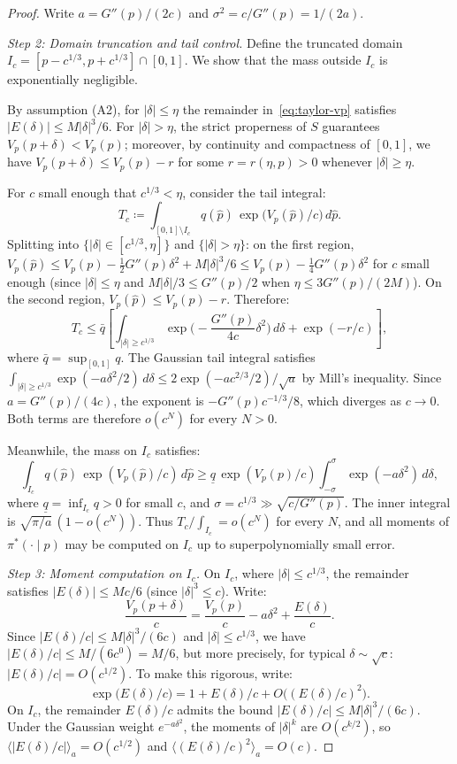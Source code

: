 \documentclass[11pt]{article}
\begin{document}
\begin{proof}
Write $a = G''(p)/(2c)$ and $\sigma^2 = c/G''(p) = 1/(2a)$.

\medskip
\textit{Step 2: Domain truncation and tail control.}
Define the truncated domain $I_c = [p - c^{1/3}, p + c^{1/3}] \cap [0,1]$. We show that the mass outside $I_c$ is exponentially negligible.

By assumption (A2), for $|\delta| \leq \eta$ the remainder in~\eqref{eq:taylor-vp} satisfies $|E(\delta)| \leq M|\delta|^3/6$. For $|\delta| > \eta$, the strict properness of $S$ guarantees $V_p(p+\delta) < V_p(p)$; moreover, by continuity and compactness of $[0,1]$, we have $V_p(p+\delta) \leq V_p(p) - r$ for some $r = r(\eta, p) > 0$ whenever $|\delta| \geq \eta$.

For $c$ small enough that $c^{1/3} < \eta$, consider the tail integral:
\[
T_c \coloneqq \int_{[0,1] \setminus I_c} q(\hat{p})\,\exp\!\big(V_p(\hat{p})/c\big)\,d\hat{p}.
\]
Splitting into $\{|\delta| \in [c^{1/3}, \eta]\}$ and $\{|\delta| > \eta\}$: on the first region, $V_p(\hat{p}) \leq V_p(p) - \frac{1}{2}G''(p)\delta^2 + M|\delta|^3/6 \leq V_p(p) - \frac{1}{4}G''(p)\delta^2$ for $c$ small enough (since $|\delta| \leq \eta$ and $M|\delta|/3 \leq G''(p)/2$ when $\eta \leq 3G''(p)/(2M)$). On the second region, $V_p(\hat{p}) \leq V_p(p) - r$. Therefore:
\[
T_c \leq \bar{q}\!\left[\int_{|\delta| \geq c^{1/3}} \exp\!\Big(-\frac{G''(p)}{4c}\delta^2\Big)\,d\delta + \exp(-r/c)\right],
\]
where $\bar{q} = \sup_{[0,1]} q$. The Gaussian tail integral satisfies $\int_{|\delta| \geq c^{1/3}} \exp(-a\delta^2/2)\,d\delta \leq 2\exp(-a c^{2/3}/2)/\sqrt{a}$ by Mill's inequality. Since $a = G''(p)/(4c)$, the exponent is $-G''(p)c^{-1/3}/8$, which diverges as $c \to 0$. Both terms are therefore $o(c^N)$ for every $N > 0$.

Meanwhile, the mass on $I_c$ satisfies:
\[
\int_{I_c} q(\hat{p})\,\exp(V_p(\hat{p})/c)\,d\hat{p} \geq \underline{q}\,\exp(V_p(p)/c)\int_{-\sigma}^{\sigma}\exp(-a\delta^2)\,d\delta,
\]
where $\underline{q} = \inf_{I_c} q > 0$ for small $c$, and $\sigma = c^{1/3} \gg \sqrt{c/G''(p)}$. The inner integral is $\sqrt{\pi/a}\,(1 - o(c^N))$. Thus $T_c / \int_{I_c} = o(c^N)$ for every $N$, and all moments of $\pi^*(\cdot \mid p)$ may be computed on $I_c$ up to superpolynomially small error.

\medskip
\textit{Step 3: Moment computation on $I_c$.}
On $I_c$, where $|\delta| \leq c^{1/3}$, the remainder satisfies $|E(\delta)| \leq M c/6$ (since $|\delta|^3 \leq c$). Write:
\[
\frac{V_p(p+\delta)}{c} = \frac{V_p(p)}{c} - a\delta^2 + \frac{E(\delta)}{c}.
\]
Since $|E(\delta)/c| \leq M|\delta|^3/(6c)$ and $|\delta| \leq c^{1/3}$, we have $|E(\delta)/c| \leq M/(6c^0) = M/6$, but more precisely, for typical $\delta \sim \sqrt{c}$: $|E(\delta)/c| = O(c^{1/2})$. To make this rigorous, write:
\[
\exp\!\big(E(\delta)/c\big) = 1 + E(\delta)/c + O\big((E(\delta)/c)^2\big).
\]
On $I_c$, the remainder $E(\delta)/c$ admits the bound $|E(\delta)/c| \leq M|\delta|^3/(6c)$. Under the Gaussian weight $e^{-a\delta^2}$, the moments of $|\delta|^k$ are $O(c^{k/2})$, so $\langle |E(\delta)/c| \rangle_{a} = O(c^{1/2})$ and $\langle (E(\delta)/c)^2 \rangle_a = O(c)$.


\end{proof}
\end{document}
